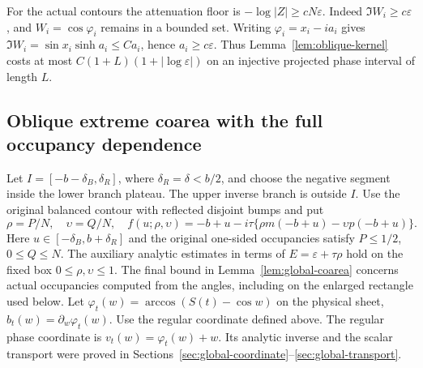 \documentclass[11pt]{article}
\numberwithin{equation}{section}
\theoremstyle{remark}\newtheorem{remark}[theorem]{Remark}
\begin{document}
For the actual contours the attenuation floor is
$-\log|Z|\ge cN\varepsilon$. Indeed $\Im W_i\ge c\varepsilon$,
and $W_i=\cos\varphi_i$ remains in a bounded set. Writing
$\varphi_i=x_i-ia_i$ gives
$\Im W_i=\sin x_i\sinh a_i\le C a_i$, hence
$a_i\ge c\varepsilon$. Thus Lemma~\ref{lem:oblique-kernel}
costs at most $C(1+L)(1+|\log\varepsilon|)$ on an injective
projected phase interval of length $L$.

\subsection{Oblique extreme coarea with the full occupancy dependence}

Let $I=[-b-\delta_B,\delta_R]$, where $\delta_R=\delta<b/2$,
and choose the negative segment inside the lower branch plateau.
The upper inverse branch is outside $I$.  Use the original balanced
contour with reflected disjoint bumps and put
\[
 \rho=P/N,\quad\upsilon=Q/N,\quad
 f(u;\rho,\upsilon)
 =-b+u-i\tau\{\rho m(-b+u)-\upsilon p(-b+u)\}.
\]
Here $u\in[-\delta_B,b+\delta_R]$ and the original one-sided
occupancies satisfy $P\le1/2$, $0\le Q\le N$.
The auxiliary analytic estimates in terms of $E=\varepsilon+\tau\rho$
hold on the fixed box $0\le\rho,\upsilon\le1$.
The final bound in Lemma~\ref{lem:global-coarea} concerns actual
occupancies computed from the angles, including on the enlarged
rectangle used below.
Let $\varphi_t(w)=\arccos(S(t)-\cos w)$ on the physical sheet,
$b_t(w)=\partial_w\varphi_t(w)$. Use the regular coordinate
defined above.
The regular phase coordinate is
$v_t(w)=\varphi_t(w)+w$.
Its analytic inverse and the scalar transport were proved in
Sections~\ref{sec:global-coordinate}--\ref{sec:global-transport}.
\end{document}
